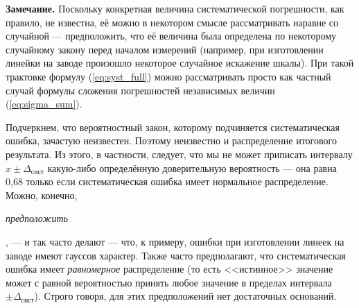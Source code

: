 {\footnotesize
\textbf{Замечание.} Поскольку конкретная
величина систематической погрешности, как правило, не известна, её
можно в некотором смысле рассматривать наравне со случайной ---
предположить, что её величина была определена по некоторому случайному
закону перед началом измерений (например, при изготовлении линейки
на заводе произошло некоторое случайное искажение шкалы). При такой
трактовке формулу (\ref{eq:syst_full}) можно рассматривать просто
как частный случай формулы сложения погрешностей независимых величин
(\ref{eq:sigma_sum}).\par

Подчеркнем, что вероятностный закон, которому подчиняется
систематическая ошибка, зачастую неизвестен. Поэтому неизвестно и
распределение итогового результата. Из этого, в частности, следует,
что мы не может приписать интервалу $x\pm\Delta_{\text{сист}}$ какую-либо
определённую доверительную вероятность --- она равна 0,68
только если систематическая ошибка имеет нормальное распределение.
Можно, конечно, }\emph{\footnotesize{}предположить}{\footnotesize{},
--- и так часто делают --- что, к примеру, ошибки
при изготовлении линеек на заводе имеют гауссов характер. Также часто
предполагают, что систематическая ошибка имеет \emph{равномерное}
распределение (то есть <<истинное>> значение может с равной вероятностью 
принять любое значение в пределах интервала $\pm\Delta_{\text{сист}}$). 
Строго говоря, для этих предположений нет достаточных оснований.\par
}%

